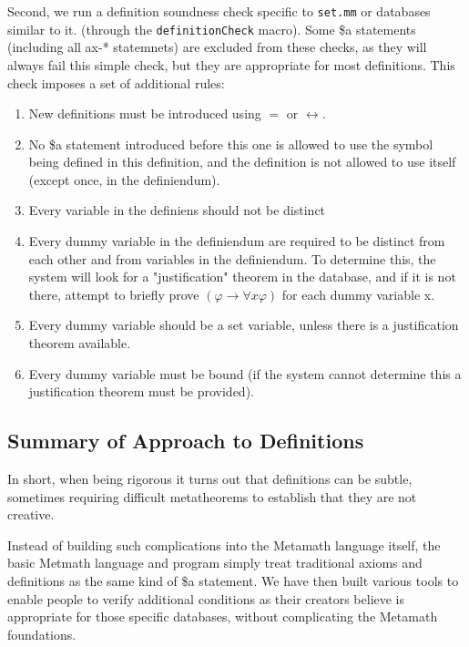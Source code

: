 Second, we run a definition soundness check specific to
\texttt{set.mm} or databases similar to it.
(through the \texttt{definitionCheck} macro).
Some \$a statements (including all ax-* statemnets)
are excluded from these checks, as they will
always fail this simple check,
but they are appropriate for most definitions.
This check imposes a set of additional rules:

\begin{enumerate}

\item New definitions must be introduced using $=$ or $\leftrightarrow$.

\item No \$a statement introduced before this one is allowed to use the
symbol being defined in this definition, and the definition is not
allowed to use itself (except once, in the definiendum).

\item Every variable in the definiens should not be distinct

\item Every dummy variable in the definiendum
are required to be distinct from each other and from variables in
the definiendum.
To determine this, the system will look for a "justification" theorem
in the database, and if it is not there, attempt to briefly prove
$( \varphi \rightarrow \forall x \varphi )$  for each dummy variable x.

\item Every dummy variable should be a set variable,
unless there is a justification theorem available.

\item Every dummy variable must be bound
(if the system cannot determine this a justification theorem must be
provided).

\end{enumerate}

\subsection{Summary of Approach to Definitions}

In short, when being rigorous it turns out that
definitions can be subtle, sometimes requiring difficult
metatheorems to establish that they are not creative.

Instead of building such complications into the Metamath language itself,
the basic Metmath language and program simply treat traditional
axioms and definitions as the same kind of \$a statement.
We have then built various tools to enable people to
verify additional conditions as their creators believe is appropriate
for those specific databases, without complicating the Metamath foundations.

